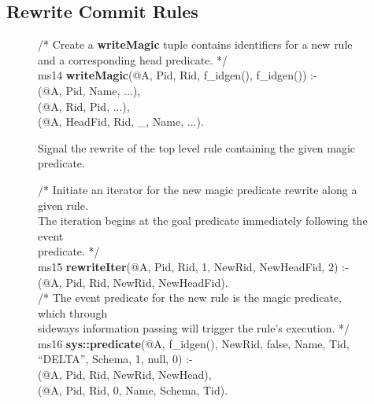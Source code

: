 \begin{appendix}
\chapter{Rewrite Commit Rules}

\begin{figure}[!t]
\ssp
\centering
\begin{boxedminipage}{\linewidth}
/* Create a {\bf writeMagic} tuple contains identifiers for a new rule \\
and a corresponding head predicate. */ \\
ms14 {\bf writeMagic}(@A, Pid, Rid, f\_idgen(), f\_idgen()) :- \\
(@A, Pid, Name, ...), \\
(@A, Rid, Pid, ...), \\
(@A, HeadFid, Rid, \_, Name, ...). \\
\end{boxedminipage}
\caption{\label{ch:evita:fig:mpgoal} Signal the rewrite of the top level rule 
containing the given magic predicate.}
\end{figure}

\begin{figure}[!t]
\ssp
\centering
\begin{boxedminipage}{\linewidth}
/* Initiate an iterator for the new magic predicate rewrite along a given rule.  \\
The iteration begins at the goal predicate immediately following the event \\
predicate. */ \\
ms15 {\bf rewriteIter}(@A, Pid, Rid, 1, NewRid, NewHeadFid, 2) :- \\
(@A, Pid, Rid, NewRid, NewHeadFid). \\

/* The event predicate for the new rule is the magic predicate, which through \\
sideways information passing will trigger the rule's execution. */ \\ 
ms16 {\bf sys::predicate}(@A, f\_idgen(), NewRid, false, Name, Tid, ``DELTA'', Schema, 1, null, 0) :- \\
(@A, Pid, Rid, NewRid, NewHead), \\
(@A, Pid, Rid, 0, Name, Schema, Tid).


\end{boxedminipage}
\end{figure}
\end{appendix}
